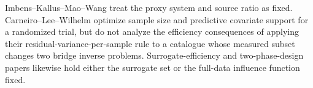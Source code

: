 Imbens--Kallus--Mao--Wang treat the proxy system and source ratio as fixed. Carneiro--Lee--Wilhelm optimize sample size and predictive covariate support for a randomized trial, but do not analyze the efficiency consequences of applying their residual-variance-per-sample rule to a catalogue whose measured subset changes two bridge inverse problems. Surrogate-efficiency and two-phase-design papers likewise hold either the surrogate set or the full-data influence function fixed.
